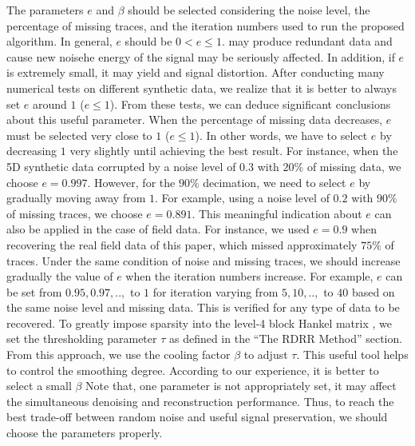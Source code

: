 {{The parameters $e$ and $\beta$ should be selected considering the noise level, the percentage of missing traces, and the iteration numbers used to run the proposed algorithm. In general, $e$ should be $ 0 < e \leq 1$.  may produce redundant data and cause new noisehe energy of the signal may be seriously affected. In addition, if $e$ is extremely small, it may yield  and signal distortion. After conducting many numerical tests on different synthetic data, we realize that it is better to always set $e$ around $1$ ($e \leq 1$). From these tests, we can deduce significant conclusions about this useful parameter. When the percentage of missing data decreases, $e$ must be selected very close to $1$ ($ e \leq 1 $). In other words, we have to select $e$ by decreasing $1$ very slightly until achieving the best result. For instance, when the 5D synthetic data  corrupted by a noise level of $0.3$ with $20\%$ of missing data, we choose $e = 0.997$. However, for the $90\%$ decimation, we need to select $e$ by gradually moving away from $1$. For example, using a noise level of $0.2$ with $90\%$ of missing traces, we choose $e = 0.891$. This meaningful indication about $e$ can also be applied in the case of field data. For instance, we used $e = 0.9$ when recovering the real field data of this paper, which missed approximately $75\%$ of traces. Under the same condition of noise and missing traces, we should increase gradually the value of $e$ when the iteration numbers increase. For example, $e$ can be set from $0.95, 0.97,..,$ to $1$ for iteration varying from $5, 10,.., $ to $40$ based on the same noise level and missing data. This is verified for any type of data to be recovered}}. 
To greatly impose sparsity into the level-4 block Hankel matrix , we set the thresholding parameter $\tau$ as defined in the “The RDRR Method” section. From this approach, we use the cooling factor $\beta$ to adjust $\tau$. This useful tool helps to control the smoothing degree. According to our experience, it is better to select a small $\beta$  Note that,  one parameter is not appropriately set, it may affect the simultaneous denoising and reconstruction performance. Thus, to reach the best trade-off between random noise  and useful signal preservation, we should choose the parameters properly.

